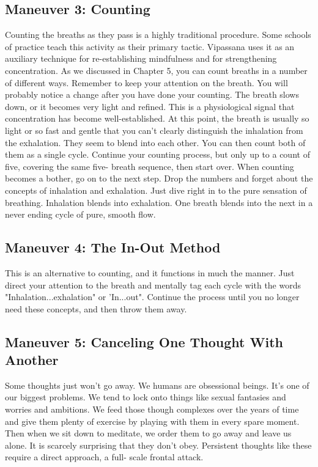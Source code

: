 \subsection*{Maneuver 3: Counting} Counting the breaths as they pass is a highly traditional
procedure. Some schools of practice teach this activity as their primary tactic.
Vipassana uses it as an auxiliary technique for re-establishing mindfulness and
for strengthening concentration. As we discussed in Chapter 5, you can count
breaths in a number of different ways. Remember to keep your attention on the
breath. You will probably notice a change after you have done your counting. The
breath slows down, or it becomes very light and refined.
This is a physiological signal that concentration has become well-established.
At this point, the breath is usually so light or so fast and gentle that you
can't clearly distinguish the inhalation from the exhalation. They seem to blend
into each other. You can then count both of them as a single cycle. Continue
your counting process, but only up to a count of five, covering the same five-
breath sequence, then start over. When counting becomes a bother, go on to the
next step. Drop the numbers and forget about the concepts of inhalation and
exhalation. Just dive right in to the pure sensation of breathing. Inhalation
blends into exhalation. One breath blends into the next in a never ending cycle
of pure, smooth flow.

\subsection*{Maneuver 4: The In-Out Method} This is an alternative to counting, and it
functions in much the manner. Just direct your attention to the breath and
mentally tag each cycle with the words "Inhalation...exhalation" or 'In...out".
Continue the process until you no longer need these concepts, and then throw
them away.

\subsection*{Maneuver 5: Canceling One Thought With Another}
Some thoughts just won't go away.  We humans are obsessional beings. It's one of
our biggest problems. We tend to lock onto things like sexual fantasies and
worries and ambitions. We feed those though complexes over the years of time and
give them plenty of exercise by playing with them in every spare moment. Then
when we sit down to meditate, we order them to go away and leave us alone. It is
scarcely surprising that they don't obey. Persistent thoughts like these require
a direct approach, a full- scale frontal attack.

